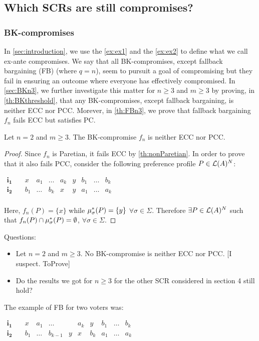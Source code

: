 \documentclass[version=3.21, pagesize, twoside=off, bibliography=totoc, DIV=calc, fontsize=12pt, a4paper]{scrartcl}
\begin{document}
\subsection{Which SCRs are still compromises?}

\subsubsection{BK-compromises}
In \cref{sec:introduction}, we use the \cref{ex:ex1} and the \cref{ex:ex2} to define what we call \oquot ex-ante compromises\cquot. We say that all BK-compromises, except fallback bargaining (FB) (where $q=n$), seem to pursuit a goal of compromising but they fail in ensuring an outcome where everyone has effectively compromised. In \cref{sec:BKn3}, we further investigate this matter for $n\geq3$ and $m\geq3$ by proving, in \cref{th:BKthreshold}, that any BK-compromises, except fallback bargaining, is neither ECC nor PCC. Morever, in \cref{th:FBn3}, we prove that fallback bargaining $f_{n}$ fails ECC but satisfies PC.

\begin{Theorem}
	Let $n=2$ and $m\geq3$. The BK-compromise $f_{n}$ is neither ECC nor PCC. 
\end{Theorem}

\begin{proof}
	Since $f_{n}$ is Paretian, it fails ECC by \cref{th:nonParetian}. In order to prove that it also fails PCC, consider the following preference profile $P\in \mathcal{L}(A)^{N}$:
\begin{center}
	$
	\begin{array}{cccccccccc}
	\mathbf{i_1} \quad &x&a_1&\dots&a_k&y&b_1&\dots&b_k\\
	\mathbf{i_2} \quad &b_1&\dots&b_{k}&x&y&a_1&\dots&a_k\\
	\end{array}
	$
\end{center}
Here, $f_n(P)=\{x\}$ while $\mu_{\sigma}^*(P)=\{y\}$ $\forall \sigma \in \Sigma$. Therefore $\exists P \in  \mathcal{L}(A)^{N}$ such that $f_n(P) \cap \mu_{\sigma}^*(P) = \emptyset$, $\forall \sigma \in \Sigma$.
\end{proof}


Questions:
\begin{itemize}
	\item Let $n=2$ and $m\geq3$. No BK-compromise  is neither ECC nor PCC. [I suspect. ToProve]
	\item Do the results we got for $n\geq3$ for the other SCR considered in section 4 still hold?
\end{itemize}
\begin{example}
	The example of FB for two voters was:
	\begin{center}
		$
		\begin{array}{cccccccccc}
		\mathbf{i_1} \quad &x&a_1&\dots&&a_k&y&b_1&\dots&b_k\\
		\mathbf{i_2} \quad &b_1&\dots&b_{k-1}&y&x&b_k&a_1&\dots&a_k\\
		\end{array}
		$
	\end{center}
\end{example}
\end{document}
